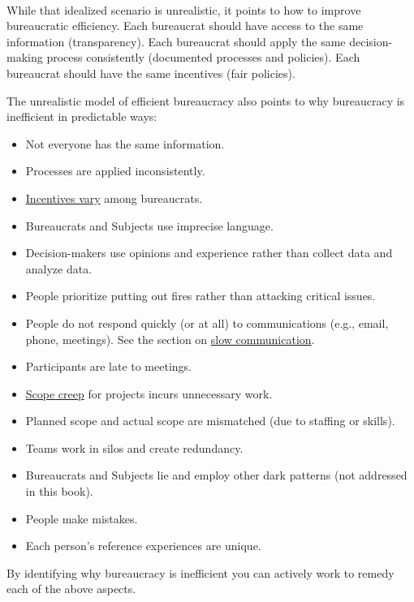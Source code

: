 \ \\

While that idealized scenario is unrealistic, it points to how to improve bureaucratic efficiency. Each bureaucrat should have access to the same information (transparency). 
Each bureaucrat should apply the same decision-making process consistently (documented processes and policies).
Each bureaucrat should have the same incentives (fair policies).

The unrealistic model of efficient bureaucracy also points to why bureaucracy is inefficient in predictable ways:
\begin{itemize}
    \item Not everyone has the same information.
    \item Processes are applied inconsistently.
    \item \hyperref[sec:motivations]{Incentives vary} among bureaucrats.
    \item Bureaucrats and Subjects use imprecise language.
    \item Decision-makers use opinions and experience rather than collect data and analyze data.
    \item People prioritize putting out fires rather than attacking critical issues.
    \item People do not respond quickly (or at all) to communications (e.g., email, phone, meetings). See the section on \hyperref[sec:slowing-communication]{slow communication}.
    \item Participants are late to meetings.
    \item \hyperref[sec:scope-creep]{Scope creep} 
    for projects incurs unnecessary work.
    \item Planned scope and actual scope are mismatched  (due to staffing or skills).
    \item Teams work in silos and create redundancy.
    \item Bureaucrats and Subjects lie and employ other dark patterns (not addressed in this book).
    \item People make mistakes.
    \item Each person's reference experiences are unique.
\end{itemize}
By identifying why bureaucracy is inefficient you can actively work to remedy each of the above aspects. 

